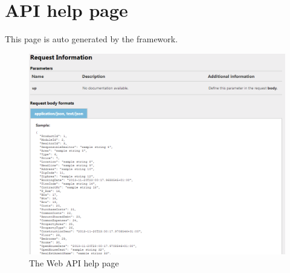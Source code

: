 \section{API help page}
This page is auto generated by the framework.
\begin{figure}[H]
\includegraphics[width=15cm]{images/productapi.png}
\caption{The Web API help page}
\end{figure}
\newpage
